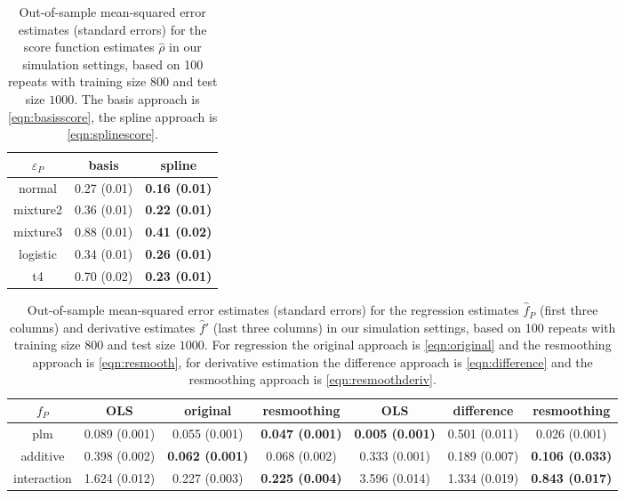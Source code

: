 \documentclass[aos]{imsart}
\begin{document}
 \begin{table}[h]
     \centering
     \begin{tabular}{c|c|c}
        $\varepsilon_P$ & basis & spline \\
        \hline
           normal  & 0.27 (0.01) & \textbf{0.16 (0.01)} \\
           mixture2  & 0.36 (0.01)  & \textbf{0.22 (0.01)} \\
           mixture3  & 0.88 (0.01)  & \textbf{0.41 (0.02)} \\
           logistic & 0.34 (0.01)  & \textbf{0.26 (0.01)} \\
           t4 & 0.70 (0.02) & \textbf{0.23 (0.01)}
     \end{tabular}
     \caption{Out-of-sample mean-squared error estimates (standard errors) for the score function estimates $\hat\rho$ in our simulation settings, based on 100 repeats with training size $800$ and test size $1000$. The basis approach is \eqref{eqn:basisscore}, the spline approach is \eqref{eqn:splinescore}.}
     \label{tab:scoremse}
 \end{table}


 \begin{table}[h]
     \centering
     \begin{tabular}{c|c|c|c||c|c|c}
        $f_P$ & OLS & original & resmoothing & OLS & difference & resmoothing \\
        \hline
    plm & 0.089 (0.001) & 0.055 (0.001) & \textbf{0.047 (0.001)} & \textbf{0.005 (0.001)} & 0.501 (0.011) & 0.026 (0.001) \\
    additive & 0.398 (0.002) & \textbf{0.062 (0.001)} & 0.068 (0.002) & 0.333 (0.001) & 0.189 (0.007) & \textbf{0.106 (0.033)} \\
    interaction & 1.624 (0.012) & 0.227 (0.003) & \textbf{0.225 (0.004)} & 3.596 (0.014) & 1.334 (0.019) & \textbf{0.843 (0.017)}
\end{tabular}
     \caption{Out-of-sample mean-squared error estimates (standard errors) for the regression estimates $\hat f_P$ (first three columns) and derivative estimates $\hat f'$ (last three columns) in our simulation settings, based on 100 repeats with training size $800$ and test size $1000$. For regression the original approach is \eqref{eqn:original} and the resmoothing approach is \eqref{eqn:resmooth}, for derivative estimation the difference approach is \eqref{eqn:difference} and the resmoothing approach is \eqref{eqn:resmoothderiv}.}
     \label{tab:derivmse}
 \end{table}
	
\end{document}
